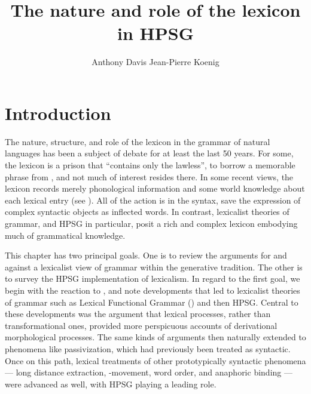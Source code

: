 \documentclass[output=paper]{langsci/langscibook}
\author{%
Anthony Davis\affiliation{Southern Oregon University}%
\lastand Jean-Pierre Koenig\affiliation{University at Buffalo}%
}
\title{The nature and role of the lexicon in HPSG}
\begin{document}
\label{chap-lexicon}

\section{Introduction}


The nature, structure, and role of the lexicon in the grammar of natural languages has been a subject of debate for at least the last 50 years. For some, the lexicon is a prison that ``contains only the lawless'',  to borrow a memorable phrase from , and not much of interest resides there. In some recent views, the lexicon records merely phonological information and some world knowledge about each lexical entry (see \citealt{Marantz1997}). All of the action is in the syntax, save the expression of complex syntactic objects as inflected words.
In contrast, lexicalist theories of grammar, and HPSG in particular, posit a rich and complex lexicon embodying much of grammatical knowledge.

This chapter has two principal goals.  One is to review the arguments for and against a lexicalist view of grammar within the generative tradition.  The other is to survey the HPSG implementation of lexicalism. In regard to the first goal, we begin with the reaction to , and note developments that led to lexicalist theories of grammar such as Lexical Functional Grammar () and then HPSG.  Central to these developments was the argument that lexical processes, rather than transformational ones, provided more perspicuous accounts of derivational morphological processes.  The same kinds of arguments then naturally extended to phenomena like passivization, which had previously been treated as syntactic.  Once on this path, lexical treatments of other prototypically syntactic phenomena — long distance extraction, -movement, word order, and anaphoric binding — were advanced as well, with HPSG playing a leading role.
\end{document}
